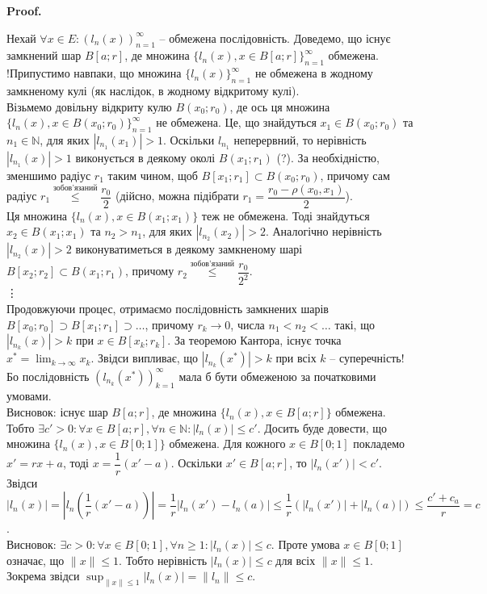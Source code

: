 \documentclass[a4paper, 10pt]{article}
\makeatletter
\theoremstyle{theoremdd}
\theoremstyle{theoremdd}
\theoremstyle{theoremdd}
\theoremstyle{theoremdd}
\theoremstyle{theoremdd}
\theoremstyle{theoremdd}
\theoremstyle{theoremdd}
\theoremstyle{theoremdd}
\renewenvironment{proof}[1][Proof.\\]{\par
\pushQED{\hfill \qed}%
\normalfont \topsep6\p@\@plus6\p@\relax
\trivlist
\item\relax
{\bfseries
#1\@addpunct{.}}\hspace\labelsep\ignorespaces
}{%
\popQED\endtrivlist\@endpefalse
}
\makeatother
\begin{document}
\begin{proof}
Нехай $\forall x \in E: (l_n(x))_{n=1}^\infty$ -- обмежена послідовність. Доведемо, що існує замкнений шар $B[a;r]$, де множина $\{l_n(x), x \in B[a;r]\}_{n=1}^\infty$ обмежена.\\ 
!Припустимо навпаки, що множина $\{l_n(x)\}_{n=1}^\infty$ не обмежена в жодному замкненому кулі (як наслідок, в жодному відкритому кулі). \\
Візьмемо довільну відкриту кулю $B(x_0;r_0)$, де ось ця множина $\{l_n(x), x \in B(x_0;r_0)\}_{n=1}^\infty$ не обмежена. Це, що знайдуться $x_1 \in B(x_0;r_0)$ та $n_1 \in \mathbb{N}$, для яких $|l_{n_1}(x_1)| > 1$. Оскільки $l_{n_1}$ неперервний, то нерівність $|l_{n_1}(x)| > 1$ виконується в деякому околі $B(x_1;r_1)$ (?). За необхідністю, зменшимо радіус $r_1$ таким чином, щоб $B[x_1;r_1] \subset B(x_0;r_0)$, причому сам радіус $r_1 \overset{\text{зобов'язаний}}{\leq} \dfrac{r_0}{2}$ (дійсно, можна підібрати $r_1 = \dfrac{r_0 - \rho(x_0,x_1)}{2}$). \\
Ця множина $\{l_n(x), x \in B(x_1;x_1)\}$ теж не обмежена. Тоді знайдуться $x_2 \in B(x_1;x_1)$ та $n_2 > n_1$, для яких $|l_{n_2}(x_2)| > 2$. Аналогічно нерівність $|l_{n_2}(x)| > 2$ виконуватиметься в деякому замкненому шарі $B[x_2;r_2] \subset B(x_1;r_1)$, причому $r_2 \overset{\text{зобов'язаний}}{\leq} \dfrac{r_0}{2^2}$.\\
\vdots \\
Продовжуючи процес, отримаємо послідовність замкнених шарів $B[x_0;r_0] \supset B[x_1;r_1] \supset \dots$, причому $r_k \to 0$, числа $n_1 < n_2 < \dots$ такі, що $|l_{n_k}(x)| > k$ при $x \in B[x_k;r_k]$. За теоремою Кантора, існує точка $x^* = \displaystyle\lim_{k \to \infty} x_k$. Звідси випливає, що $|l_{n_k}(x^*)| > k$ при всіх $k$ -- суперечність! Бо послідовність $(l_{n_k}(x^*))_{k=1}^\infty$ мала б бути обмеженою за початковими умовами.\\
Висновок: існує шар $B[a;r]$, де множина $\{l_n(x), x \in B[a;r]\}$ обмежена. Тобто $\exists c' > 0: \forall x \in B[a;r], \forall n \in \mathbb{N}: |l_n(x)| \leq c'$. Досить буде довести, що множина $\{l_n(x), x \in B[0;1]\}$ обмежена. Для кожного $x \in B[0;1]$ покладемо $x' = rx + a$, тоді $x = \dfrac{1}{r}(x'-a)$. Оскільки $x' \in B[a;r]$, то $|l_n(x')| < c'$. Звідси\\
$|l_n(x)| = \left| l_n \left( \dfrac{1}{r}(x'-a) \right) \right| = \dfrac{1}{r} |l_n(x') - l_n(a)| \leq \dfrac{1}{r} (|l_n(x')| + |l_n(a)|) \leq \dfrac{c'+c_a}{r} = c$.\\
Висновок: $\exists c > 0: \forall x \in B[0;1], \forall n \geq 1: |l_n(x)| \leq c$. Проте умова $x \in B[0;1]$ означає, що $\|x\| \leq 1$. Тобто нерівність $|l_n(x)| \leq c$ для всіх $\|x\| \leq 1$. Зокрема звідси $\displaystyle\sup_{\|x\| \leq 1} |l_n(x)| = \|l_n\| \leq c$.
\end{proof}
\end{document}
